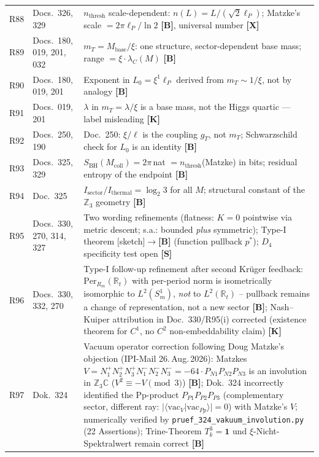\begin{longtable}{@{}p{0.9cm}p{3.1cm}p{10.2cm}@{}}
R88 & Docs.~326, 329 & $n_{\mathrm{thresh}}$ scale-dependent: $n(L)=L/(\sqrt{2}\ell_P)$; Matzke's scale $=2\pi\ell_P/\ln 2$ \textbf{[B]}, universal number \textbf{[X]} \\
R89 & Docs.~180, 019, 201, 032 & $m_T = M_\mathrm{base}/\xi$: one structure, sector-dependent base mass; range $=\xi\cdot\lambda_C(M)$ \textbf{[B]} \\
R90 & Docs.~180, 019, 201 & Exponent in $L_0 = \xi^1\ell_P$ derived from $m_T\sim1/\xi$, not by analogy \textbf{[B]} \\
R91 & Docs.~019, 201 & $\lambda$ in $m_T=\lambda/\xi$ is a base mass, not the Higgs quartic --- label misleading \textbf{[K]} \\
R92 & Docs.~250, 190 & Doc.~250: $\xi/\ell$ is the coupling $g_T$, not $m_T$; Schwarzschild check for $L_0$ is an identity \textbf{[B]} \\
R93 & Docs.~325, 329 & $S_\mathrm{BH}(M_\mathrm{coll}) = 2\pi$\,nat $= n_\mathrm{thresh}$(Matzke) in bits; residual entropy of the endpoint \textbf{[B]} \\
R94 & Doc.~325 & $I_\mathrm{sector}/I_\mathrm{thermal} = \log_2 3$ for all $M$; structural constant of the $\mathbb{Z}_3$ geometry \textbf{[B]} \\
R95 & Docs.~330, 270, 314, 327 & Two wording refinements (flatness: $K{=}0$ pointwise via metric descent; s.a.: bounded \emph{plus} symmetric); Type-I theorem [sketch]$\to$\textbf{[B]} (function pullback $p^*$); $D_4$ specificity test open \textbf{[S]} \\
R96 & Docs.~330, 332, 270 & Type-I follow-up refinement after second Krüger feedback: $\mathrm{Per}_{R_m}(\mathbb{R}_t)$ with per-period norm is isometrically isomorphic to $L^2(S^1_m)$, \emph{not} to $L^2(\mathbb{R}_t)$ -- pullback remains a change of representation, not a new sector \textbf{[B]}; Nash--Kuiper attribution in Doc.~330/R95(i) corrected (existence theorem for $C^1$, no $C^2$ non-embeddability claim) \textbf{[K]} \\
R97 & Dok.~324 & Vacuum operator correction following Doug Matzke's objection (IPI-Mail 26.\,Aug.\,2026): Matzkes $V = N_1^+N_2^+N_3^+N_1^-N_2^-N_3^- = -64\cdot P_{N1}P_{N2}P_{N3}$ is an involution in $\mathbb{Z}_3\mathbb{C}$ ($V^2 \equiv -V \pmod{3}$) \textbf{[B]}; Dok.~324 incorrectly identified the Pp-product $P_{P1}P_{P2}P_{P3}$ (complementary sector, different ray: $|\langle\mathrm{vac}_V|\mathrm{vac}_{Pp}\rangle|=0$) with Matzke's $V$; numerically verified by \texttt{pruef\_324\_vakuum\_involution.py} (22 Assertions); Trine-Theorem $T_k^3=\mathbf{1}$ und $\xi$-Nicht-Spektralwert remain correct \textbf{[B]} \\

\end{longtable}
